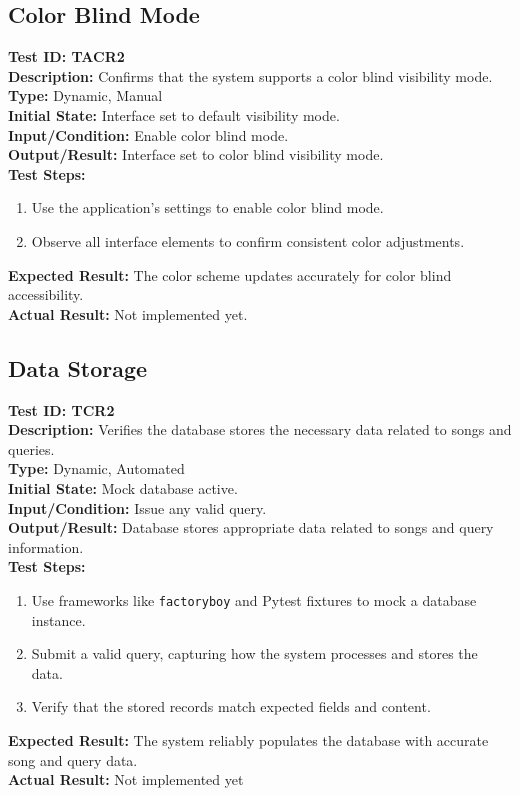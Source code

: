\documentclass[12pt, titlepage]{article}
\begin{document}
\subsection{Color Blind Mode}
\textbf{Test ID: TACR2}\\
\textbf{Description:} Confirms that the system supports a color blind visibility mode.\\
\textbf{Type:} Dynamic, Manual\\
\textbf{Initial State:} Interface set to default visibility mode.\\
\textbf{Input/Condition:} Enable color blind mode.\\
\textbf{Output/Result:} Interface set to color blind visibility mode.\\
\textbf{Test Steps:}
\begin{enumerate}
    \item Use the application’s settings to enable color blind mode.
    \item Observe all interface elements to confirm consistent color adjustments.
\end{enumerate}
\textbf{Expected Result:} The color scheme updates accurately for color blind accessibility.\\
\textbf{Actual Result:} Not implemented yet.

\subsection{Data Storage}
\textbf{Test ID: TCR2}\\
\textbf{Description:} Verifies the database stores the necessary data related to songs and queries.\\
\textbf{Type:} Dynamic, Automated\\
\textbf{Initial State:} Mock database active.\\
\textbf{Input/Condition:} Issue any valid query.\\
\textbf{Output/Result:} Database stores appropriate data related to songs and query information.\\
\textbf{Test Steps:}
\begin{enumerate}
    \item Use frameworks like \texttt{factoryboy} and Pytest fixtures to mock a database instance.
    \item Submit a valid query, capturing how the system processes and stores the data.
    \item Verify that the stored records match expected fields and content.
\end{enumerate}
\textbf{Expected Result:} The system reliably populates the database with accurate song and query data.\\
\textbf{Actual Result:} Not implemented yet
\end{document}
